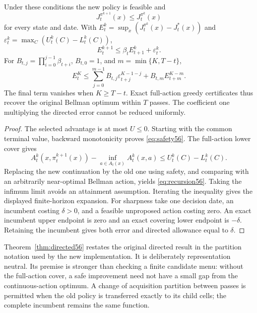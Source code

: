 \begin{theorem}\label{thm:directed56}
Under these conditions the new policy is feasible and
\begin{equation}\label{eq:safety56}
 J_t^{\pi^{k+1}}(x)\le J_t^{\pi^k}(x)
\end{equation}
for every state and date. With $E_t^k=\sup_x(J_t^{\pi^k}(x)-J_t^*(x))$ and $\varepsilon_t^k=\max_C(U_t^k(C)-L_t^k(C))$,
\begin{equation}\label{eq:recursion56}
 E_t^{k+1}\le\beta_tE_{t+1}^k+\varepsilon_t^k.
\end{equation}
For $B_{t,j}=\prod_{i=0}^{j-1}\beta_{t+i}$, $B_{t,0}=1$, and $m=\min\{K,T-t\}$,
\[
 E_t^K\le\sum_{j=0}^{m-1}B_{t,j}\varepsilon_{t+j}^{K-1-j}
              +B_{t,m}E_{t+m}^{K-m}.
\]
The final term vanishes when $K\ge T-t$. Exact full-action greedy certificates thus recover the original Bellman optimum within $T$ passes. The coefficient one multiplying the directed error cannot be reduced uniformly.
\end{theorem}
\begin{proof}
The selected advantage is at most $U\le0$. Starting with the common terminal value, backward monotonicity proves \eqref{eq:safety56}. The full-action lower cover gives
\[
 A_t^k(x,\pi_t^{k+1}(x))-\inf_{a\in A_t(x)}A_t^k(x,a)
 \le U_t^k(C)-L_t^k(C).
\]
Replacing the new continuation by the old one using safety, and comparing with an arbitrarily near-optimal Bellman action, yields \eqref{eq:recursion56}. Taking the infimum limit avoids an attainment assumption. Iterating the inequality gives the displayed finite-horizon expansion. For sharpness take one decision date, an incumbent costing $\delta>0$, and a feasible unproposed action costing zero. An exact incumbent upper endpoint is zero and an exact covering lower endpoint is $-\delta$. Retaining the incumbent gives both error and directed allowance equal to $\delta$.
\end{proof}

Theorem~\ref{thm:directed56} restates the original directed result in the partition notation used by the new implementation. It is deliberately representation neutral. Its premise is stronger than checking a finite candidate menu: without the full-action cover, a safe improvement need not have a small gap from the continuous-action optimum. A change of acquisition partition between passes is permitted when the old policy is transferred exactly to its child cells; the complete incumbent remains the same function.

